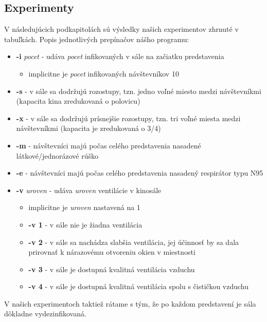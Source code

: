 \documentclass[a4paper, 11pt]{article}
\begin{document}
        \subsection{Experimenty}
        V následujúcich podkapitolách sú výsledky našich experimentov zhrnuté v tabuľkách. Popis jednotlivých prepínačov nášho programu:
        \begin{itemize}
            \item \textbf{-i} \textit{pocet} - udáva \textit{pocet} infikovaných v sále na začiatku predstavenia
                \begin{itemize}
                    \item implicitne je \textit{pocet} infikovaných návštevníkov 10
                \end{itemize}
            \item \textbf{-s} - v sále sa dodržujú rozostupy, tzn. jedno voľné miesto medzi návštevníkmi (kapacita kina zredukovaná o polovicu)
            \item \textbf{-x} - v sále sa dodržujú prísnejšie rozostupy, tzn. tri voľné miesta medzi návštevníkmi (kapacita je zredukovaná o 3/4)
            \item \textbf{-m} - návštevníci majú počas celého predstavenia nasadené látkové/jednorázové rúško
            \item \textbf{-e} - návštevníci majú počas celého predstavenia nasadený respirátor typu N95
            \item \textbf{-v} \textit{uroven} - udáva \textit{uroven} ventilácie v kinosále
                \begin{itemize}
                    \item implicitne je \textit{uroven} nastavená na 1
                    \item \textbf{-v 1} - v sále nie je žiadna ventilácia
                    \item \textbf{-v 2} - v sále sa nachádza slabšia ventilácia, jej  účinnosť by sa dala prirovnať k nárazovému otvoreniu okien v miestnosti
                    \item \textbf{-v 3} - v sále je dostupná kvalitná ventilácia vzduchu
                    \item \textbf{-v 4} - v sále je dostupná kvalitná ventilácia spolu s čističkou vzduchu
                \end{itemize}
        \end{itemize}
        
        V našich experimentoch taktiež rátame s tým, že po každom predstavení je sála dôkladne vydezinfikovaná.
        
\end{document}
